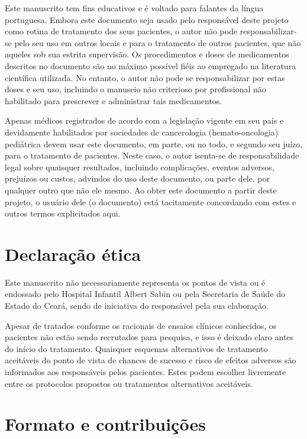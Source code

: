 \documentclass[11pt,a4paper,oldfontcommands]{memoir}
\begin{document}
Este manuscrito tem fins educativos e é voltado para falantes da língua portuguesa.  Embora este documento seja usado pelo responsável deste projeto como rotina de tratamento dos seus pacientes, o autor não pode responsabilizar-se pelo seu uso em outros locais e para o tratamento de outros pacientes, que não aqueles sob sua estrita supervisão. Os procedimentos e doses de medicamentos descritos no documento são no máximo possível fiéis ao empregado na literatura científica utilizada. No entanto, o autor não pode se responsabilizar por estas doses e seu uso, incluindo o manuseio não criterioso por profissional não habilitado para prescrever e administrar tais medicamentos. 

Apenas médicos registrados de acordo com a legislação vigente em seu país e devidamente habilitados por sociedades de cancerologia (hemato-oncologia) pediátrica devem usar este documento, em parte, ou no todo, e segundo seu juízo, para o tratamento de pacientes. Neste caso, o autor isenta-se de responsabilidade legal sobre quaisquer resultados, incluindo complicações, eventos adversos, prejuízos ou custos, advindos do uso deste documento, ou parte dele, por qualquer outro que não ele mesmo. Ao obter este documento a partir deste projeto, o usuário dele (o documento) está tacitamente concordando com estes e outros termos explicitados aqui.

\section{Declaração ética}

Este manuscrito não necessariamente representa os pontos de vista ou é endossado pelo Hospital Infantil Albert Sabin ou pela Secretaria de Saúde do Estado do Ceará, sendo de iniciativa do responsável pela sua elaboração.

Apesar de tratados conforme os racionais de ensaios clínicos conhecidos, os pacientes não estão sendo recrutados para pesquisa, e isso é deixado claro antes do início do tratamento. Quaisquer esquemas alternativos de tratamento aceitáveis do ponto de vista de chances de sucesso e risco de efeitos adversos são informados aos responsáveis pelos pacientes. Estes podem escolher livremente entre os protocolos propostos ou tratamentos alternativos aceitáveis.

\section{Formato e contribuições}
\end{document}
